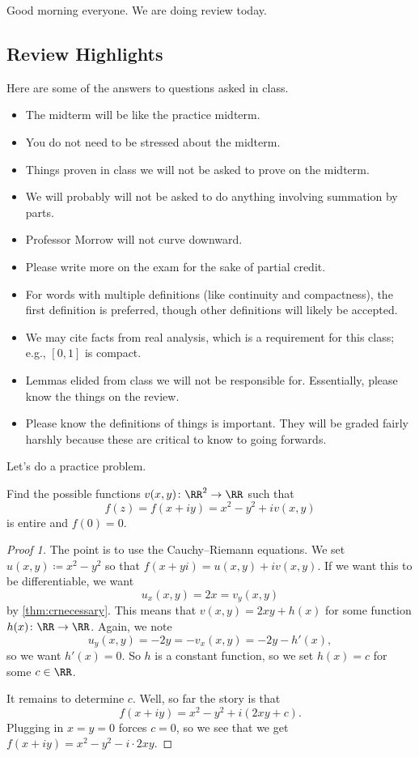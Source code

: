 
Good morning everyone. We are doing review today.

\subsection{Review Highlights}
Here are some of the answers to questions asked in class.
\begin{itemize}
	\item The midterm will be like the practice midterm.
	\item You do not need to be stressed about the midterm.
	\item Things proven in class we will not be asked to prove on the midterm.
	\item We will probably will not be asked to do anything involving summation by parts.
	\item Professor Morrow will not curve downward.
	\item Please write more on the exam for the sake of partial credit.
	\item For words with multiple definitions (like continuity and compactness), the first definition is preferred, though other definitions will likely be accepted.
	\item We may cite facts from real analysis, which is a requirement for this class; e.g., $[0,1]$ is compact.
	\item Lemmas elided from class we will not be responsible for. Essentially, please know the things on the review.
	\item Please know the definitions of things is important. They will be graded fairly harshly because these are critical to know to going forwards.
\end{itemize}
Let's do a practice problem.
\begin{exe}
	Find the possible functions $v(x,y)\colon \RR^2\to\RR$ such that
	\[f(z)=f(x+iy)=x^2-y^2+iv(x,y)\]
	is entire and $f(0)=0$.
\end{exe}
\begin{proof}[Proof 1]
	The point is to use the Cauchy--Riemann equations. We set $u(x,y)\coloneqq x^2-y^2$ so that $f(x+yi)=u(x,y)+iv(x,y)$. If we want this to be differentiable, we want
	\[u_x(x,y)=2x=v_y(x,y)\]
	by \autoref{thm:crnecessary}. This means that $v(x,y)=2xy+h(x)$ for some function $h(x)\colon \RR\to\RR$. Again, we note
	\[u_y(x,y)=-2y=-v_x(x,y)=-2y-h'(x),\]
	so we want $h'(x)=0$. So $h$ is a constant function, so we set $h(x)=c$ for some $c\in\RR$.

	It remains to determine $c$. Well, so far the story is that
	\[f(x+iy)=x^2-y^2+i(2xy+c).\]
	Plugging in $x=y=0$ forces $c=0$, so we see that we get $\boxed{f(x+iy)=x^2-y^2-i\cdot 2xy}$.
\end{proof}
